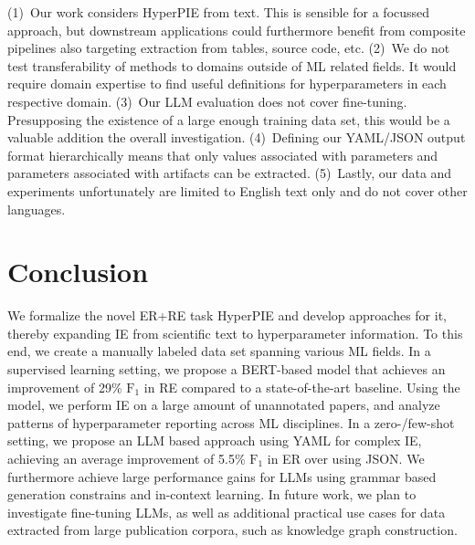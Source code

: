 (1)~Our work considers HyperPIE from text. This is sensible for a focussed approach, but downstream applications could furthermore benefit from composite pipelines also targeting extraction from tables, source code, etc.
(2)~We do not test transferability of methods to domains outside of ML related fields. It would require domain expertise to find useful definitions for hyperparameters in each respective domain.
(3)~Our LLM evaluation does not cover fine-tuning. Presupposing the existence of a large enough training data set, this would be a valuable addition the overall investigation.
(4)~Defining our YAML/JSON output format hierarchically means that only values associated with parameters and parameters associated with artifacts can be extracted.
(5)~Lastly, our data and experiments unfortunately are limited to English text only and do not cover other languages.







\section{Conclusion}\label{sec:hyper-conclusion}


We formalize the novel ER+RE task HyperPIE and develop approaches for it, thereby expanding IE from scientific text to hyperparameter information. To this end, we create a manually labeled data set spanning various ML fields. In a supervised learning setting, we propose a BERT-based model that achieves an improvement of 29\% $\text{F}_1$ in RE compared to a state-of-the-art baseline. Using the model, we perform IE on a large amount of unannotated papers, and analyze patterns of hyperparameter reporting across ML disciplines. In a zero-/few-shot setting, we propose an LLM based approach using YAML for complex IE, achieving an average improvement of 5.5\% $\text{F}_1$ in ER over using JSON. We furthermore achieve large performance gains for LLMs using grammar based generation constrains and in-context learning. In future work, we plan to investigate fine-tuning LLMs, as well as additional practical use cases for data extracted from large publication corpora, such as knowledge graph construction.

